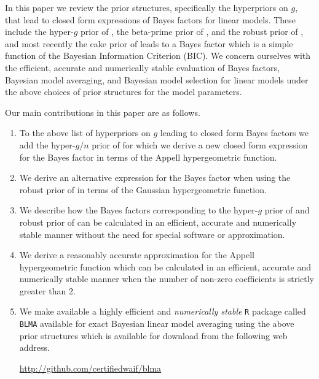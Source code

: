 \documentclass[12pt]{article}
\begin{document}
In this paper we review the prior structures, specifically the hyperpriors on $g$, 
that lead to closed form expressions of Bayes factors for linear models.
These include the hyper-$g$ prior of \cite{Liang2008}, the beta-prime prior of \cite{Maruyama2011}, and the robust 
prior of \cite{Bayarri2012}, and most recently the cake prior of \cite{OrmerodEtal2017} leads to a Bayes factor which is a simple function of the Bayesian Information Criterion (BIC). We concern ourselves with the efficient, accurate and numerically stable evaluation of Bayes factors, Bayesian model averaging,
and Bayesian model selection  for linear models 
under the above choices of prior structures for the model parameters.


Our main contributions in this paper are as follows.
\begin{enumerate}
	\item To the above list of hyperpriors on $g$ leading to closed form Bayes factors
	we add the  hyper-$g/n$ prior of \cite{Liang2008} for which we
	derive a new closed form expression for the Bayes factor in terms
	of the Appell hypergeometric function.
	
	\item We derive an alternative expression for the Bayes factor when using the
	robust prior of \cite{Bayarri2012} in terms of the Gaussian hypergeometric function.
	
	\item We describe how the  Bayes factors corresponding to the hyper-$g$ prior of \cite{Liang2008} 
	and robust prior of \cite{Bayarri2012} can be calculated in an efficient, accurate and numerically 
	stable manner without the need for special software or approximation.
	
	\item We derive a reasonably accurate approximation for the Appell hypergeometric function
	which can be calculated in an efficient, accurate and numerically 
	stable manner when the number of non-zero coefficients is strictly greater than 2.
	
	\item We make available a highly efficient and {\it numerically stable} {\tt R}
	package called
	{\tt BLMA} available
	for exact Bayesian linear model averaging 
	using the above prior structures which is available for download from the following web address.
	\begin{center}
	\url{http://github.com/certifiedwaif/blma}
	\end{center}
\end{enumerate}
\end{document}
